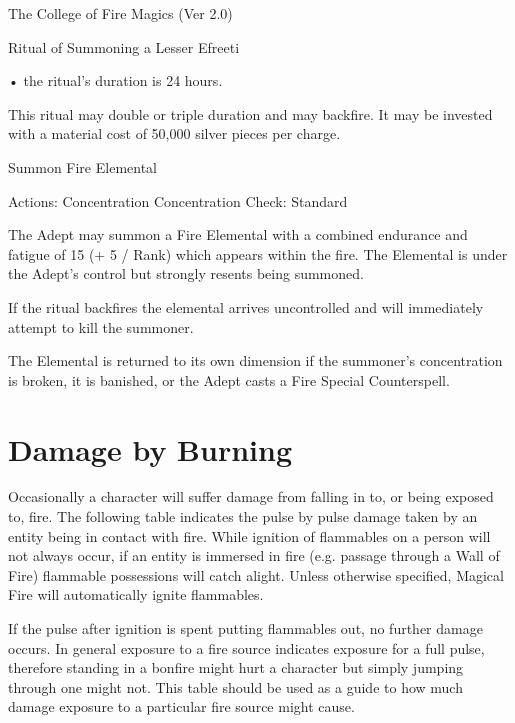 \begin{Chapter}{The College of Fire Magics (Ver 2.0)}
\begin{ritual}[R-3]{Ritual of Summoning a Lesser Efreeti}
\begin{effects}
• the ritual’s duration is 24 hours. 

This  ritual  may  double  or  triple  duration  and  may 
backfire. It may be invested with a material cost of 
50,000 silver pieces per charge. 

\end{effects}
\end{ritual}

\begin{ritual}[R-4]{Summon Fire Elemental}

Actions: Concentration 
Concentration Check: Standard 
\begin{effects}
The Adept may summon a Fire Elemental with a combined endurance and
fatigue of 15 (+ 5 / Rank) which appears within the fire.  The
Elemental is under the Adept’s control but strongly resents being
summoned.

If the ritual backfires the elemental arrives uncontrolled and will
immediately attempt to kill the summoner.

The Elemental is returned to its own dimension if the summoner’s
concentration is broken, it is banished, or the Adept casts a Fire
Special Counterspell.
\end{effects}
\end{ritual}



\section{Damage by Burning}

Occasionally a character will suffer damage from falling in to, or
being exposed to, fire. The following table indicates the pulse by
pulse damage taken by an entity being in contact with fire. While
ignition of flammables on a person will not always occur, if an entity
is immersed in fire (e.g. passage through a Wall of Fire) flammable
possessions will catch alight.  Unless otherwise specified, Magical
Fire will automatically ignite flammables.

If the pulse after ignition is spent putting flammables out, no
further damage occurs.  In general exposure to a fire source indicates
exposure for a full pulse, therefore standing in a bonfire might hurt
a character but simply jumping through one might not. This table
should be used as a guide to how much damage exposure to a particular
fire source might cause.


\end{Chapter}
